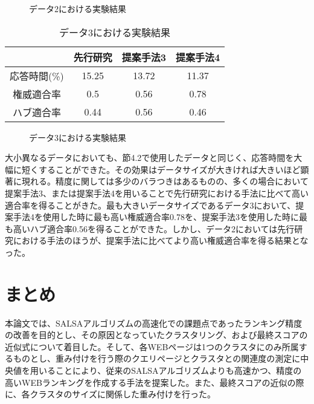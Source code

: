 \documentclass[a4paper,11pt]{jreport}
\begin{document}
\begin{figure}[htbp]
\begin{center}
\end{center}
\caption{データ2における実験結果}
\label{figure:sample}
\end{figure}

\begin{table}[htb]
\begin{center}
\caption{データ3における実験結果}
\begin{tabular}{|c||c|c|c|} \hline 
    & 先行研究 & 提案手法3 & 提案手法4 \\ \hline \hline
    応答時間(\%) & 15.25 & 13.72 & 11.37 \\  \hline
    権威適合率 & 0.5 & 0.56 & 0.78 \\ \hline
    ハブ適合率 & 0.44 & 0.56 & 0.46 \\ \hline
\end{tabular}
\end{center}
\end{table}

\begin{figure}[htbp]
\begin{center}
\end{center}
\caption{データ3における実験結果}
\label{figure:sample}
\end{figure}

大小異なるデータにおいても、節4.2で使用したデータと同じく、応答時間を大幅に短くすることができた。その効果はデータサイズが大きければ大きいほど顕著に現れる。精度に関しては多少のバラつきはあるものの、多くの場合において提案手法3、または提案手法4を用いることで先行研究における手法に比べて高い適合率を得ることがきた。最も大きいデータサイズであるデータ3において、提案手法4を使用した時に最も高い権威適合率0.78を、提案手法3を使用した時に最も高いハブ適合率0.56を得ることができた。しかし、データ2においては先行研究における手法のほうが、提案手法に比べてより高い権威適合率を得る結果となった。

\chapter{まとめ}

本論文では、SALSAアルゴリズムの高速化での課題点であったランキング精度の改善を目的とし、その原因となっていたクラスタリング、および最終スコアの近似式について着目した。そして、各WEBページは1つのクラスタにのみ所属するものとし、重み付けを行う際のクエリページとクラスタとの関連度の測定に中央値を用いることにより、従来のSALSAアルゴリズムよりも高速かつ、精度の高いWEBランキングを作成する手法を提案した。また、最終スコアの近似の際に、各クラスタのサイズに関係した重み付けを行った。
\end{document}
